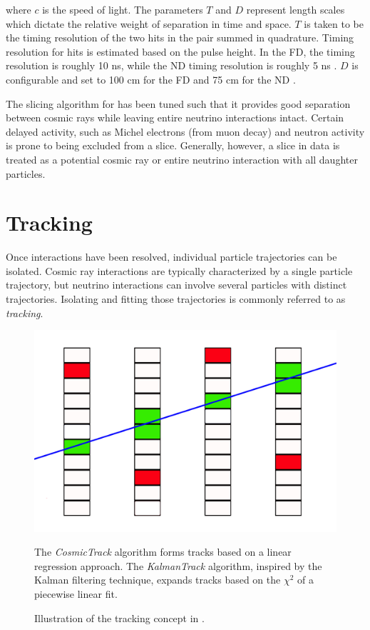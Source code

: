 where $c$ is the speed of light.  The parameters $T$ and $D$ represent
length scales which dictate the relative weight of separation in time and
space.
$T$ is taken to be the timing resolution  of the two hits
in the pair summed in quadrature.
Timing resolution for hits is estimated based on the pulse height.
In the FD,
the timing resolution is roughly 10 ns, while the ND timing resolution
is roughly 5 ns \cite{niner2015thesis}.
$D$ is configurable and set to 100 cm for the FD and 75 cm for the ND
\cite{baird2015thesis}.

The slicing algorithm for \nova has been tuned such that it provides good
separation between cosmic rays while leaving entire neutrino interactions
intact.  Certain delayed activity, such as Michel electrons (from muon decay)
and neutron activity is prone to being excluded from a slice.
Generally, however, a slice in \nova data is treated as a potential cosmic ray
or entire neutrino interaction with all daughter particles.


\section{Tracking}

Once interactions have been resolved, individual particle trajectories can be
isolated.
Cosmic ray interactions are typically characterized by a single particle
trajectory, but neutrino interactions can involve several particles with
distinct trajectories.
Isolating and fitting those trajectories is commonly referred to as
\textit{tracking}.

\begin{figure}[t]
\begin{center}
\includegraphics[width=\textwidth]{figures/figures/tracking.jpg}
\end{center}
\caption{Illustration of the tracking concept in \nova.}{The \textit{CosmicTrack} algorithm forms tracks
 based on a linear regression approach.  The \textit{KalmanTrack} algorithm,
 inspired by the Kalman filtering technique, expands tracks based on the
 $\chi^2$ of a piecewise linear fit.}
\label{tracking}
\end{figure}

